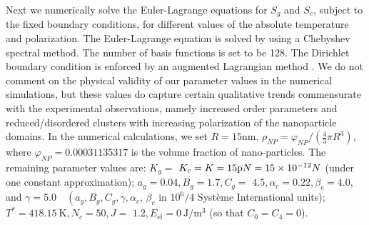 \documentclass[reprint,amsfonts,amsmath,amssymb,aps,pre,floatfix,10pt]{revtex4-1}
\begin{document}
Next we numerically solve the Euler-Lagrange equations for $S_g$ and $S_c$, subject to the fixed boundary conditions, for different values of the absolute temperature and polarization. The Euler-Lagrange equation is solved by using a Chebyshev spectral method. The number of basis functions is set to be 128. The Dirichlet boundary condition is enforced by an augmented Lagrangian method \cite{shen2011spectral_62}.
We do not comment on the physical validity of our parameter values in the numerical simulations, but these values do capture certain qualitative trends commensurate with the experimental observations, namely increased order parameters and reduced/disordered clusters with increasing polarization of the nanoparticle domains.
In the numerical calculations, we set $R = 15 \mathrm{nm}$,  $\rho_{NP} = \varphi_{NP} / (\tfrac{4}{3} \pi R^3)$, where $\varphi_{NP} = 0.00031135317$ is the volume fraction of nano-particles. The remaining parameter values are: \(K_{g}=\) \(K_{c}=K=15 {\rm p} N=15 \times 10^{-12} N \) (under one constant approximation); \(a_{g}=0.04, B_{g}=1.7, C_{g}=\) \(4.5, \alpha_{c}=0.22, \beta_{c}=4.0, \quad\) and \(\gamma=5.0 \quad\left(a_{g}, B_{g}, C_{g}, \gamma, \alpha_{c}\right.\), \(\beta_{c}\) in $10^6/4$ Syst{\`e}me
International units); \(T^{*}=418.15 \mathrm{~K}, N_{c}=50, J=\) \(1.2, E_{\mathrm{el}}=0 ~ \mathrm{J} / \mathrm{m}^{3}\) (so that $C_0 = C_4 = 0$).%
\end{document}
